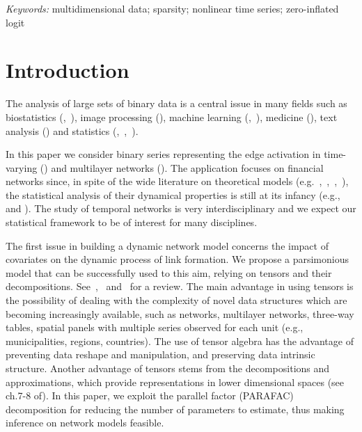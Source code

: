 \documentclass[12pt,a4paper]{article}
\theoremstyle{custom}
\begin{document}
\noindent%
{\it Keywords:} multidimensional data; sparsity; nonlinear time series; zero-inflated logit
\vfill

\newpage
{} %



\section{Introduction}
The analysis of large sets of binary data is a central issue in many fields such as biostatistics (\cite{Schildcrout05Longitudinal_Binary},~\cite{Wilbur02multivariate_Binary_regression}), image processing (\cite{Yue12Binary_neuroimaging}), machine learning (\cite{Banerjee08sparse_ML_binary},~\cite{Koh07logistic_l1regularized}), medicine (\cite{Christakis08socialNetwork_medicine}), text analysis (\cite{Taddy13multinomial_text}) and statistics (\cite{Ravikumar10Ising_logistic_l1regularized},~\cite{Sherman06Binary_autologistic_spatial},~\cite{Visaya15multivariate_Binary_longitudinal}).

In this paper we consider binary series representing the edge activation in time-varying (\cite{Holme12TemporalNetworks}) and multilayer networks (\cite{Boccaletti14Multilayer_Networks}).
The application focuses on financial networks since, in spite of the wide literature on theoretical models (e.g.~\cite{Acemoglu12Network_AggregateFluctuations},~\cite{Chaney14aer_InternTradeNetwork},~\cite{Mele17ecta_FormationDenseNetwork},~\cite{Graham17ecta_FormationNetwork_degree_heterogeneity}), the statistical analysis of their dynamical properties is still at its infancy (e.g., \cite{Billioetal12GrangerNet} and \cite{Diebold14NetworkTopology}). The study of temporal networks is very interdisciplinary and we expect our statistical framework to be of interest for many disciplines.

The first issue in building a dynamic network model concerns the impact of covariates on the dynamic process of link formation. We propose a parsimonious model that can be successfully used to this aim, relying on tensors and their decompositions. See~\cite{KoldaBader09},~\cite{Cichocki15Tensor_Multiway_Analysis} and~\cite{Cichocki16Tensor_theory} for a review. The main advantage in using tensors is the possibility of dealing with the complexity of novel data structures which are becoming increasingly available, such as networks, multilayer networks, three-way tables, spatial panels with multiple series observed for each unit (e.g., municipalities, regions, countries).
The use of tensor algebra has the advantage of preventing data reshape and manipulation, and preserving data intrinsic structure. Another advantage of tensors stems from the decompositions and approximations, which provide representations in lower dimensional spaces (see ch.7-8 of\cite{Hackbusch12Tensor_book}). In this paper, we exploit the parallel factor (PARAFAC) decomposition for reducing the number of parameters to estimate, thus making inference on network models feasible.
\end{document}
